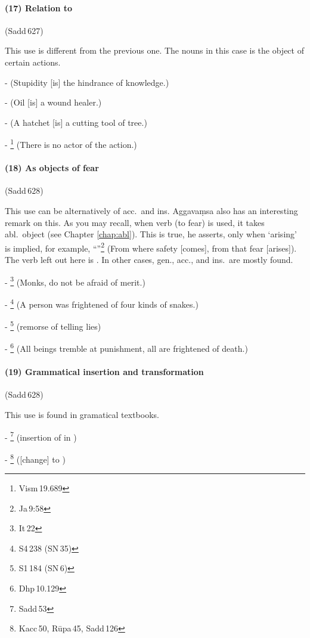 \paragraph*{(17) Relation to } (Sadd\,627)\par
This use is different from the previous one. The nouns in this case is the object of certain actions.\par
-  (Stupidity [is] the hindrance of knowledge.)\par
-  (Oil [is] a wound healer.)\par
-  (A hatchet [is] a cutting tool of tree.)\par
- \footnote{Vism\,19.689} (There is no actor of the action.)\par

\paragraph*{(18) As objects of fear} (Sadd\,628)\par
This use can be alternatively of acc.\ and ins. Aggava\d msa also has an interesting remark on this. As you may recall, when verb  (to fear) is used, it takes abl.\ object (see Chapter \ref{chap:abl}). This is true, he asserts, only when `arising' is implied, for example, ``''\footnote{Ja\,9:58} (From where safety [comes], from that fear [arises]). The verb left out here is . In other cases, gen., acc., and ins.\ are mostly found.\par
- \footnote{It\,22} (Monks, do not be afraid of merit.)\par
- \footnote{S4\,238 (SN\,35)} (A person was frightened of four kinds of snakes.)\par
- \footnote{S1\,184 (SN\,6)} (remorse of telling lies)\par
- \footnote{Dhp\,10.129} (All beings tremble at punishment, all are frightened of death.)\par

\paragraph*{(19) Grammatical insertion and transformation} (Sadd\,628)\par
This use is found in gramatical textbooks.\par
- \footnote{Sadd\,53} (insertion of  in )\par
- \footnote{Kacc\,50, R\=upa\,45, Sadd\,126} ([change]  to )\par

